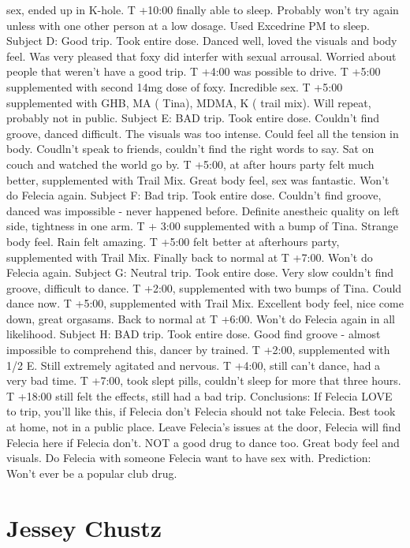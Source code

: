 \documentclass[12pt]{book}
\begin{document}
sex, ended up in K-hole. T +10:00 finally able to sleep. Probably won't try again unless with one other person at a low dosage. Used Excedrine PM to sleep. Subject D: Good trip. Took entire dose. Danced well, loved the visuals and body feel. Was very pleased that foxy did interfer with sexual arrousal. Worried about people that weren't have a good trip. T +4:00 was possible to drive. T +5:00 supplemented with second 14mg dose of foxy. Incredible sex. T +5:00 supplemented with GHB, MA ( Tina), MDMA, K ( trail mix). Will repeat, probably not in public. Subject E: BAD trip. Took entire dose. Couldn't find groove, danced difficult. The visuals was too intense. Could feel all the tension in body. Coudln't speak to friends, couldn't find the right words to say. Sat on couch and watched the world go by. T +5:00, at after hours party felt much better, supplemented with Trail Mix. Great body feel, sex was fantastic. Won't do Felecia again. Subject F: Bad trip. Took entire dose. Couldn't find groove, danced was impossible - never happened before. Definite anestheic quality on left side, tightness in one arm. T + 3:00 supplemented with a bump of Tina. Strange body feel. Rain felt amazing. T +5:00 felt better at afterhours party, supplemented with Trail Mix. Finally back to normal at T +7:00. Won't do Felecia again. Subject G: Neutral trip. Took entire dose. Very slow couldn't find groove, difficult to dance. T +2:00, supplemented with two bumps of Tina. Could dance now. T +5:00, supplemented with Trail Mix. Excellent body feel, nice come down, great orgasams. Back to normal at T +6:00. Won't do Felecia again in all likelihood. Subject H: BAD trip. Took entire dose. Good find groove - almost impossible to comprehend this, dancer by trained. T +2:00, supplemented with 1/2 E. Still extremely agitated and nervous. T +4:00, still can't dance, had a very bad time. T +7:00, took slept pills, couldn't sleep for more that three hours. T +18:00 still felt the effects, still had a bad trip. Conclusions: If Felecia LOVE to trip, you'll like this, if Felecia don't Felecia should not take Felecia. Best took at home, not in a public place. Leave Felecia's issues at the door, Felecia will find Felecia here if Felecia don't. NOT a good drug to dance too. Great body feel and visuals. Do Felecia with someone Felecia want to have sex with. Prediction: Won't ever be a popular club drug.



\chapter{Jessey Chustz}
\end{document}
